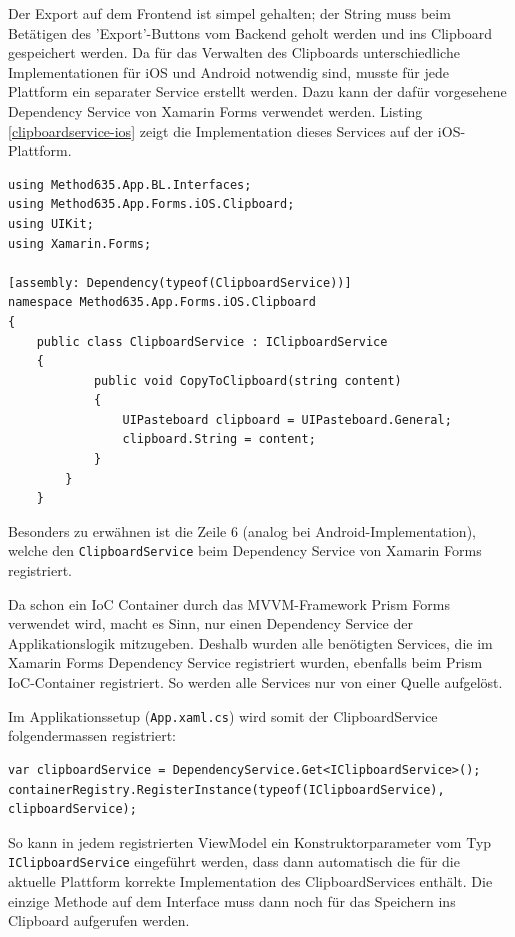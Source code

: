 Der Export auf dem Frontend ist simpel gehalten; der String muss beim Betätigen des 'Export'-Buttons vom Backend geholt werden und ins Clipboard gespeichert werden. Da für das Verwalten des Clipboards unterschiedliche Implementationen für iOS und Android notwendig sind, musste für jede Plattform ein separater Service erstellt werden. Dazu kann der dafür vorgesehene Dependency Service von Xamarin Forms verwendet werden. Listing \ref{clipboardservice-ios} zeigt die Implementation dieses Services auf der iOS-Plattform.
\begin{lstlisting}[morekeywords={assembly,namespace,typeof,string}, label={clipboardservice-ios},caption={Clipboard Service auf iOS}]
using Method635.App.BL.Interfaces;
using Method635.App.Forms.iOS.Clipboard;
using UIKit;
using Xamarin.Forms;

[assembly: Dependency(typeof(ClipboardService))]
namespace Method635.App.Forms.iOS.Clipboard
{
	public class ClipboardService : IClipboardService
	{
			public void CopyToClipboard(string content)
			{
				UIPasteboard clipboard = UIPasteboard.General;
				clipboard.String = content;
			}
		}
	}
\end{lstlisting}
Besonders zu erwähnen ist die Zeile 6 (analog bei Android-Implementation), welche den \texttt{ClipboardService} beim Dependency Service von Xamarin Forms registriert. 

Da schon ein IoC Container durch das MVVM-Framework Prism Forms verwendet wird, macht es Sinn, nur einen Dependency Service der Applikationslogik mitzugeben. Deshalb wurden alle benötigten Services, die im Xamarin Forms Dependency Service registriert wurden, ebenfalls beim Prism IoC-Container registriert. So werden alle Services nur von einer Quelle aufgelöst.

Im Applikationssetup (\texttt{App.xaml.cs}) wird somit der ClipboardService folgendermassen registriert:
\begin{lstlisting}
var clipboardService = DependencyService.Get<IClipboardService>();
containerRegistry.RegisterInstance(typeof(IClipboardService), clipboardService);
\end{lstlisting}
So kann in jedem registrierten ViewModel ein Konstruktorparameter vom Typ \texttt{IClipboard\-Service} eingeführt werden, dass dann automatisch die für die aktuelle Plattform korrekte Implementation des ClipboardServices enthält. Die einzige Methode auf dem Interface muss dann noch für das Speichern ins Clipboard aufgerufen werden. 


